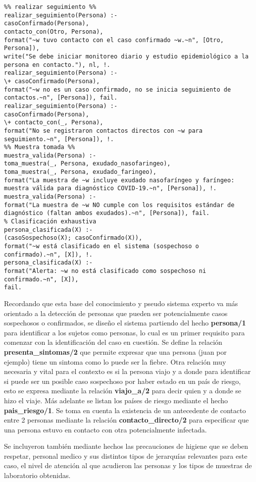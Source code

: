 \documentclass[11pt, letterpaper]{article}
\begin{document}
\begin{verbatim}
%% realizar seguimiento %%
realizar_seguimiento(Persona) :-
casoConfirmado(Persona),
contacto_con(Otro, Persona),
format("~w tuvo contacto con el caso confirmado ~w.~n", [Otro, Persona]),
write("Se debe iniciar monitoreo diario y estudio epidemiológico a la persona en contacto."), nl, !.
realizar_seguimiento(Persona) :-
\+ casoConfirmado(Persona),
format("~w no es un caso confirmado, no se inicia seguimiento de contactos.~n", [Persona]), fail.
realizar_seguimiento(Persona) :-
casoConfirmado(Persona),
\+ contacto_con(_, Persona),
format("No se registraron contactos directos con ~w para seguimiento.~n", [Persona]), !.
%% Muestra tomada %%
muestra_valida(Persona) :-
toma_muestra(_, Persona, exudado_nasofaringeo),
toma_muestra(_, Persona, exudado_faringeo),
format("La muestra de ~w incluye exudado nasofaríngeo y faríngeo: muestra válida para diagnóstico COVID-19.~n", [Persona]), !.
muestra_valida(Persona) :-
format("La muestra de ~w NO cumple con los requisitos estándar de diagnóstico (faltan ambos exudados).~n", [Persona]), fail.
% Clasificación exhaustiva
persona_clasificada(X) :-
(casoSospechoso(X); casoConfirmado(X)),
format("~w está clasificado en el sistema (sospechoso o confirmado).~n", [X]), !.
persona_clasificada(X) :-
format("Alerta: ~w no está clasificado como sospechoso ni confirmado.~n", [X]),
fail.
\end{verbatim}
	
Recordando que esta base del conocimiento y pseudo sistema experto va más orientado a la detección de personas que pueden ser potencialmente casos sospechosos o confirmados, se diseño el sistema partiendo del hecho \textbf{persona/1} para identificar a los sujetos como personas, lo cual es un primer requisito para comenzar con la identificación del caso en cuestión. Se define la relación \textbf{presenta\_sintomas/2} que permite expresar que una persona (juan por ejemplo) tiene un sintoma como lo puede ser la fiebre. Otra relación muy necesaria y vital para el contexto es si la persona viajo y a donde para identificar si puede ser un posible caso sospechoso por haber estado en un país de riesgo, esto se expresa mediante la relación \textbf{viajo\_a/2} para decir quien y a donde se hizo el viaje. Más adelante se listan los países de riesgo mediante el hecho \textbf{pais\_riesgo/1}. Se toma en cuenta la existencia de un antecedente de contacto entre 2 personas mediante la relación \textbf{contacto\_directo/2} para especificar que una persona estuvo en contacto con otra potencialmente infectada.

Se incluyeron también mediante hechos las precauciones de higiene que se deben respetar, personal medico y sus distintos tipos de jerarquías relevantes para este caso, el nivel de atención al que acudieron las personas y los tipos de muestras de laboratorio obtenidas.
	
\end{document}
